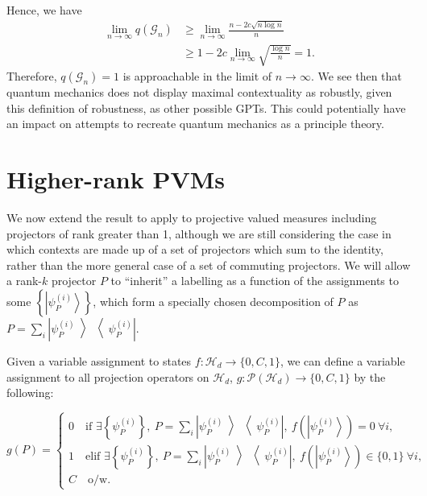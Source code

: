 \documentclass{amsart}
\theoremstyle{definition}
\newcommand{\ket}[1]{{\left\vert{#1}\right\rangle}}
\newcommand{\ketbra}[1]{{\left\vert {#1}\middle\rangle\middle\langle{#1}\right\vert}}
\begin{document}
Hence, we have
\begin{align}
\lim_{n\rightarrow\infty}q(\mathcal{G}_n)&\geq\lim_{n\rightarrow\infty}\frac{n-2c\sqrt{n\log n}}{n}\\
&\geq 1-2c\lim_{n\rightarrow\infty}\sqrt{\frac{\log n}{n}}=1.
\end{align}
Therefore, $q(\mathcal{G}_n)=1$ is approachable in the limit of $n\rightarrow\infty$. We see then that quantum mechanics does not display maximal contextuality as robustly, given this definition of robustness, as other possible GPTs. This could potentially have an impact on attempts to recreate quantum mechanics as a principle theory.

\FloatBarrier

\section{Higher-rank PVMs}\label{highrank}

We now extend the result to apply to projective valued measures including projectors of rank greater than 1, although we are still considering the case in which contexts are made up of a set of projectors which sum to the identity, rather than the more general case of a set of commuting projectors. We will allow a rank-$k$ projector $P$ to ``inherit'' a labelling as a function of the assignments to some $\left\{\ket{\psi_P^{(i)}}\right\}$, which form a specially chosen decomposition of $P$ as $P=\sum_i \ketbra{\psi_P^{(i)}}$.

Given a variable assignment to states $f:\mathcal{H}_d\rightarrow \{0,C,1\}$, we can define a variable assignment to all projection operators on $\mathcal{H}_d$, $g:\mathcal{P}(\mathcal{H}_d)\rightarrow \{0,C,1\}$ by the following:

\begin{equation}
g(P)=\begin{cases}
0\quad \mbox{if } \exists \left\{\psi_P^{(i)}\right\}, \>P=\sum_i \ketbra{\psi_P^{(i)}}, \>f\left(\ket{\psi_P^{(i)}}\right)=0\>\forall i,\\
1\quad \mbox{elif } \exists \left\{\psi_P^{(i)}\right\}, \>P=\sum_i \ketbra{\psi_P^{(i)}}, \>f\left(\ket{\psi_P^{(i)}}\right)\in\{0,1\}\>\forall i, \\
C\quad \mbox{o/w.}
\end{cases}
\end{equation}
\end{document}
